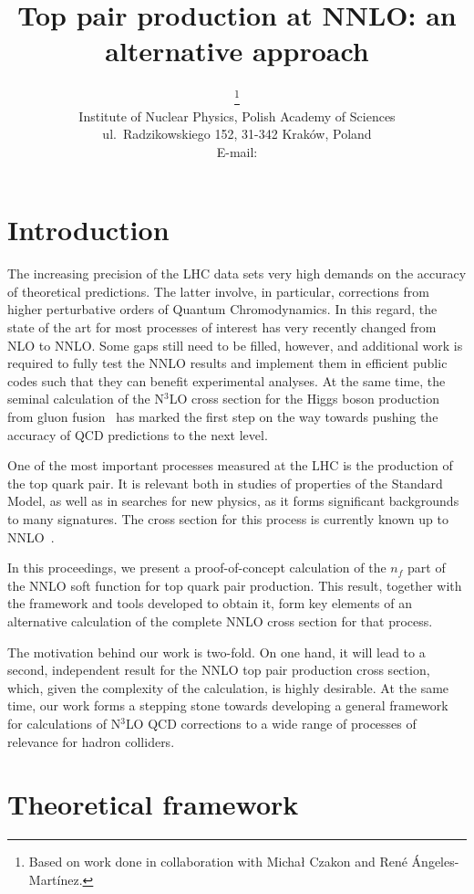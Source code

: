 \documentclass{PoS}
\title{Top pair production at NNLO: an alternative approach}
\author{\speaker{Sebastian Sapeta}\thanks{
  Based on work done in collaboration with Micha\l{} Czakon and Ren\'e
  \'Angeles-Mart\'inez.
  }\\
  Institute of Nuclear Physics, Polish Academy of Sciences \\
  ul.\ Radzikowskiego 152, 31-342 Krak\'ow, Poland\\
  E-mail: \email{sebastian.sapeta@ifj.edu.pl}}
\begin{document}
\section{Introduction}

The increasing precision of the LHC data sets very high demands on the accuracy
of theoretical predictions. The latter involve, in particular, corrections from
higher perturbative orders of Quantum Chromodynamics.
%
In this regard, the state of the art for most processes of interest has very
recently changed from NLO to NNLO. Some gaps still need to be filled, however,
and additional work is required to fully test the NNLO results and implement
them in efficient public codes such that they can benefit experimental analyses.
%
At the same time, the seminal calculation of the N$^3$LO cross section for the
Higgs boson production from gluon fusion~\cite{Anastasiou:2015ema} has marked
the first step on the way towards pushing the accuracy of QCD predictions to the
next level.

One of the most important processes measured at the LHC is the production of the
top quark pair.  It is relevant both in studies of properties of the Standard
Model, as well as in searches for new physics, as it forms significant
backgrounds to many signatures. The cross section for this process is currently
known up to NNLO~\cite{Baernreuther:2012ws, Czakon:2012pz, Czakon:2012zr, Czakon:2013goa, Czakon:2015owf, Czakon:2016ckf}.

In this proceedings, we present a proof-of-concept calculation of the $n_f$ part
of the NNLO soft function for top quark pair production. This result, together
with the framework and tools developed to obtain it, form key  elements of
an alternative calculation of the complete NNLO cross section for that process.

The motivation behind our work is two-fold. On one hand, it will lead to a
second, independent result for the NNLO top pair production cross section,
which, given the complexity of the calculation, is highly desirable.
At the same time, our work forms a stepping stone towards developing a general
framework for calculations of N$^3$LO QCD corrections to a wide range of
processes of relevance for hadron colliders.


\section{Theoretical framework}
\end{document}
